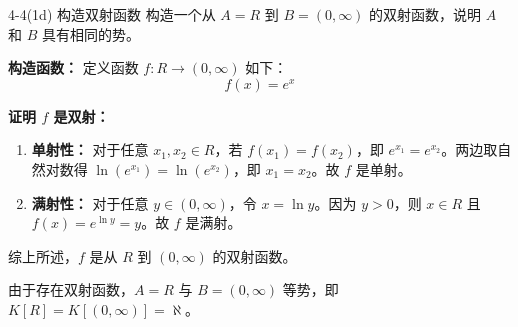 \documentclass[11pt]{article}
\begin{document}
\maketitle
\thispagestyle{empty}
\newpage


\begin{question}{4-4(1d) 构造双射函数}
  构造一个从 $A = R$ 到 $B = (0, \infty)$ 的双射函数，说明 $A$ 和 $B$ 具有相同的势。

  \begin{answer}
    \textbf{构造函数：}
    定义函数 $f: R \to (0, \infty)$ 如下：
    $$f(x) = e^x$$

    \textbf{证明 $f$ 是双射：}
    \begin{enumerate}
      \item \textbf{单射性：} 对于任意 $x_1, x_2 \in R$，若 $f(x_1) = f(x_2)$，即 $e^{x_1} = e^{x_2}$。两边取自然对数得 $\ln(e^{x_1}) = \ln(e^{x_2})$，即 $x_1 = x_2$。故 $f$ 是单射。
      \item \textbf{满射性：} 对于任意 $y \in (0, \infty)$，令 $x = \ln y$。因为 $y > 0$，则 $x \in R$ 且 $f(x) = e^{\ln y} = y$。故 $f$ 是满射。
    \end{enumerate}

    综上所述，$f$ 是从 $R$ 到 $(0, \infty)$ 的双射函数。

    \begin{info}[结论:]
      由于存在双射函数，$A = R$ 与 $B = (0, \infty)$ 等势，即 $K[R] = K[(0, \infty)] = \aleph$。
    \end{info}
  \end{answer}
\end{question}

\end{document}
